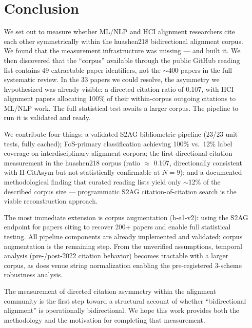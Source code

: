 \section{Conclusion}
\label{sec:conclusion}

We set out to measure whether ML/NLP and HCI alignment researchers cite each other symmetrically within the huashen218 bidirectional alignment corpus.
We found that the measurement infrastructure was missing --- and built it.
We then discovered that the ``corpus'' available through the public GitHub reading list contains 49 extractable paper identifiers, not the $\sim$400 papers in the full systematic review.
In the 33 papers we could resolve, the asymmetry we hypothesized was already visible: a directed citation ratio of 0.107, with HCI alignment papers allocating 100\% of their within-corpus outgoing citations to ML/NLP work.
The full statistical test awaits a larger corpus. The pipeline to run it is validated and ready.

We contribute four things: a validated S2AG bibliometric pipeline (23/23 unit tests, fully cached); FoS-primary classification achieving 100\% vs.\ 12\% label coverage on interdisciplinary alignment corpora; the first directional citation measurement in the huashen218 corpus (ratio $\approx$ 0.107, directionally consistent with H-CitAsym but not statistically confirmable at $N=9$); and a documented methodological finding that curated reading lists yield only $\sim$12\% of the described corpus size --- programmatic S2AG citation-of-citation search is the viable reconstruction approach.

The most immediate extension is corpus augmentation (h-e1-v2): using the S2AG endpoint for papers citing \citet{Shen2024Position} to recover 200+ papers and enable full statistical testing.
All pipeline components are already implemented and validated; corpus augmentation is the remaining step.
From the unverified assumptions, temporal analysis (pre-/post-2022 citation behavior) becomes tractable with a larger corpus, as does venue string normalization enabling the pre-registered 3-scheme robustness analysis.

The measurement of directed citation asymmetry within the alignment community is the first step toward a structural account of whether ``bidirectional alignment'' is operationally bidirectional.
We hope this work provides both the methodology and the motivation for completing that measurement.
